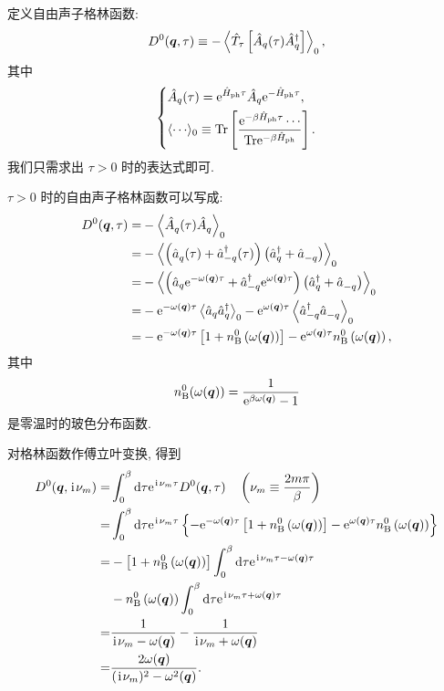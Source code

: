 定义自由声子格林函数: 
\begin{equation}
    D^{0}(\boldsymbol{q},\tau)\equiv -\left\langle \hat{T}_\tau \left[ \hat{A}_q(\tau)\hat{A}_q^\dagger \right] \right\rangle_0,
\end{equation}
其中
\begin{equation}
    \left\{
        \begin{aligned}
            &\hat{A}_q(\tau)=\e^{\hat{H}_{\fun{ph}}\tau}\hat{A}_{q}\e^{-\hat{H}_{\fun{ph}}\tau},\\
            &\lag\cdots\rag_0\equiv \fun{Tr}\lmi \frac{\e^{-\beta\hat{H}_{\fun{ph}}\tau}\cdots}{\fun{Tr}\e^{-\beta\hat{H}_{\fun{ph}}}} \rmi.
        \end{aligned}
    \right.
\end{equation}
我们只需求出 $\tau>0$ 时的表达式即可.

$\tau>0$ 时的自由声子格林函数可以写成: 
\begin{align}
        D^{0}(\boldsymbol{q},\tau)=&-\left\langle \hat{A}_q^{ }(\tau)\hat{A}_q^{ } \right\rangle_0\nonumber\\
        =&-\left\langle \left( \hat{a}_q^{ }(\tau)+\hat{a}_{-q}^\dagger(\tau) \right) \left( \hat{a}_q^\dagger+\hat{a}_{-q}^{ } \right) \right\rangle_0\nonumber\\
        =&-\left\langle \left( \hat{a}_q\mathrm{e}^{-\omega(\boldsymbol{q})\tau}+\hat{a}^\dagger_{-q}\mathrm{e}^{\omega(\boldsymbol{q})\tau} \right) \left( \hat{a}_q^\dagger+\hat{a}_{-q}^{ } \right) \right\rangle_0\nonumber\\
        =&-\mathrm{e}^{-\omega(\boldsymbol{q})\tau}\left\langle \hat{a}_q\hat{a}_q^\dagger \right\rangle_0 -\mathrm{e}^{\omega(\boldsymbol{q})\tau}\left\langle \hat{a}_{-q}^\dagger \hat{a}_{-q}^{ } \right\rangle_0\nonumber\\
        =&-\mathrm{e}^{-\omega(\boldsymbol{q})\tau}\left[ 1+n_{\mathrm{B}}^{0}\left(\omega(\boldsymbol{q})\right) \right]-\mathrm{e}^{\omega(\boldsymbol{q})\tau}n_{\mathrm{B}}^{0}\left( \omega(\boldsymbol{q}) \right),
    \end{align}
其中 
\begin{equation}
    n_{\mathrm{B}}^{0}(\omega(\boldsymbol{q}))=\frac{1}{\mathrm{e}^{\beta\omega(\boldsymbol{q})}-1}
\end{equation}
是零温时的玻色分布函数.

对格林函数作傅立叶变换, 得到  
 \begin{align}
        D^{0}(\boldsymbol{q},\hspace{0.1em}\mathrm{i}\hspace{0.1em}\nu_m)=&\int_0^\beta\mathrm{d}\tau\mathrm{e}^{\hspace{0.1em}\mathrm{i}\hspace{0.1em}\nu_m\tau}D^{0}(\boldsymbol{q},\tau)\quad\left( \nu_m\equiv \frac{2m\pi}{\beta} \right)\nonumber\\
        =&\int_0^\beta\mathrm{d}\tau \mathrm{e}^{\hspace{0.1em}\mathrm{i}\hspace{0.1em}\nu_m\tau}\left\{ -\mathrm{e}^{-\omega(\boldsymbol{q})\tau}\left[ 1+n_{\mathrm{B}}^{0}\left(\omega(\boldsymbol{q})\right) \right]-\mathrm{e}^{\omega(\boldsymbol{q})\tau} n_{\mathrm{B}}^{0}\left( \omega(\boldsymbol{q}) \right) \right\}\nonumber\\
        =&-\left[ 1+n_{\mathrm{B}}^{0}\left( \omega(\boldsymbol{q}) \right) \right]\int_0^\beta\mathrm{d}\tau\mathrm{e}^{\hspace{0.1em}\mathrm{i}\hspace{0.1em}\nu_m\tau-\omega(\boldsymbol{q})\tau}\nonumber\\
        &-n_{\mathrm{B}}^{0}\left( \omega(\boldsymbol{q}) \right) \int_0^\beta\mathrm{d}\tau\mathrm{e}^{\hspace{0.1em}\mathrm{i}\hspace{0.1em}\nu_m\tau+\omega(\boldsymbol{q})\tau} \nonumber\\
        =&\frac{1}{\hspace{0.1em}\mathrm{i}\hspace{0.1em}\nu_m-\omega(\boldsymbol{q})}-\frac{1}{\hspace{0.1em}\mathrm{i}\hspace{0.1em}\nu_m+\omega(\boldsymbol{q})}\nonumber\\
        =&\frac{2\omega(\boldsymbol{q})}{(\hspace{0.1em}\mathrm{i}\hspace{0.1em}\nu_m)^2-\omega^2(\boldsymbol{q})}.
    \end{align}


